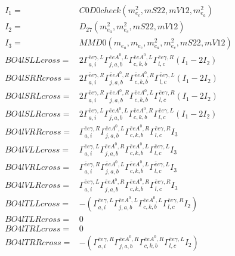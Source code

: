 \documentclass[A4,landscape]{article}
\begin{document}
\begin{align} 
I_1 = & C0D0check(m^2_{e_{{c}}}, mS22, mV12, m^2_{e_{{a}}}) \\ 
I_2 = & D_{27}(m^2_{e_{{a}}}, m^2_{e_{{c}}}, mS22, mV12) \\ 
I_3 = & MMD0(m_{e_{{a}}}, m_{e_{{c}}}, m^2_{e_{{a}}}, m^2_{e_{{c}}}, mS22, mV12) \\ 
  BO4lSLLcross= & 2  \Gamma^{\bar{e}e \gamma ,L}_{a, i} \Gamma^{\bar{e}e A^0 ,L}_{j, a, b} \Gamma^{\bar{e}e A^0 ,L}_{c, k, b} \Gamma^{\bar{e}e \gamma ,R}_{l, c} (I_1 - 2 I_2) \\ 
  BO4lSRRcross= & 2  \Gamma^{\bar{e}e \gamma ,R}_{a, i} \Gamma^{\bar{e}e A^0 ,R}_{j, a, b} \Gamma^{\bar{e}e A^0 ,R}_{c, k, b} \Gamma^{\bar{e}e \gamma ,L}_{l, c} (I_1 - 2 I_2) \\ 
  BO4lSRLcross= & 2  \Gamma^{\bar{e}e \gamma ,R}_{a, i} \Gamma^{\bar{e}e A^0 ,R}_{j, a, b} \Gamma^{\bar{e}e A^0 ,L}_{c, k, b} \Gamma^{\bar{e}e \gamma ,R}_{l, c} (I_1 - 2 I_2) \\ 
  BO4lSLRcross= & 2  \Gamma^{\bar{e}e \gamma ,L}_{a, i} \Gamma^{\bar{e}e A^0 ,L}_{j, a, b} \Gamma^{\bar{e}e A^0 ,R}_{c, k, b} \Gamma^{\bar{e}e \gamma ,L}_{l, c} (I_1 - 2 I_2) \\ 
  BO4lVRRcross= &  \Gamma^{\bar{e}e \gamma ,R}_{a, i} \Gamma^{\bar{e}e A^0 ,L}_{j, a, b} \Gamma^{\bar{e}e A^0 ,R}_{c, k, b} \Gamma^{\bar{e}e \gamma ,R}_{l, c} I_3 \\ 
  BO4lVLLcross= &  \Gamma^{\bar{e}e \gamma ,L}_{a, i} \Gamma^{\bar{e}e A^0 ,R}_{j, a, b} \Gamma^{\bar{e}e A^0 ,L}_{c, k, b} \Gamma^{\bar{e}e \gamma ,L}_{l, c} I_3 \\ 
  BO4lVRLcross= &  \Gamma^{\bar{e}e \gamma ,R}_{a, i} \Gamma^{\bar{e}e A^0 ,L}_{j, a, b} \Gamma^{\bar{e}e A^0 ,L}_{c, k, b} \Gamma^{\bar{e}e \gamma ,L}_{l, c} I_3 \\ 
  BO4lVLRcross= &  \Gamma^{\bar{e}e \gamma ,L}_{a, i} \Gamma^{\bar{e}e A^0 ,R}_{j, a, b} \Gamma^{\bar{e}e A^0 ,R}_{c, k, b} \Gamma^{\bar{e}e \gamma ,R}_{l, c} I_3 \\ 
  BO4lTLLcross= & -( \Gamma^{\bar{e}e \gamma ,L}_{a, i} \Gamma^{\bar{e}e A^0 ,L}_{j, a, b} \Gamma^{\bar{e}e A^0 ,L}_{c, k, b} \Gamma^{\bar{e}e \gamma ,R}_{l, c} I_2) \\ 
  BO4lTLRcross= & 0 \\ 
  BO4lTRLcross= & 0 \\ 
  BO4lTRRcross= & -( \Gamma^{\bar{e}e \gamma ,R}_{a, i} \Gamma^{\bar{e}e A^0 ,R}_{j, a, b} \Gamma^{\bar{e}e A^0 ,R}_{c, k, b} \Gamma^{\bar{e}e \gamma ,L}_{l, c} I_2) \\ 
\end{align} 
\end{document}
